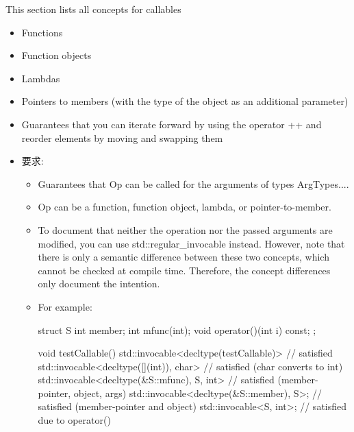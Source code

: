 
This section lists all concepts for callables

\begin{itemize}
\item
Functions

\item
Function objects

\item
Lambdas

\item
Pointers to members (with the type of the object as an additional parameter)
\end{itemize}



\begin{itemize}
\item
Guarantees that you can iterate forward by using the operator ++ and reorder elements by moving and swapping them

\item
要求:
\begin{itemize}
\item
Guarantees that Op can be called for the arguments of types ArgTypes....

\item
Op can be a function, function object, lambda, or pointer-to-member.

\item
To document that neither the operation nor the passed arguments are modified, you can use std::regular\_invocable instead. However, note that there is only a semantic difference between these two concepts, which cannot be checked at compile time. Therefore, the concept differences only document the intention.

\item
For example:

\begin{cpp}
struct S {
	int member;
	int mfunc(int);
	void operator()(int i) const;
};

void testCallable()
{
	std::invocable<decltype(testCallable)> // satisfied
	std::invocable<decltype([](int){}), char> // satisfied (char converts to int)
	std::invocable<decltype(&S::mfunc), S, int> // satisfied (member-pointer, object, args)
	std::invocable<decltype(&S::member), S>; // satisfied (member-pointer and object)
	std::invocable<S, int>; // satisfied due to operator()
}
\end{cpp}


\end{itemize}
\end{itemize}
